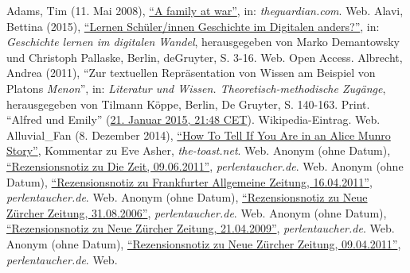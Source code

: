 \documentclass[fontsize=12pt]{scrartcl}
\begin{document}
{{{{\begin{thebibliography}
{\addtolength{\leftmargin}{0,8cm}}
{\setlength{\itemindent}{0,8cm}}
	Adams, Tim (11. Mai 2008), \href{http://www.theguardian.com/books/2008/may/11/fiction.biography}{"`A family at war"'}, in: \textit{theguardian.com}. Web.
	Alavi, Bettina (2015), \href{http://www.degruyter.com/view/books/9783486858662/9783486858662-002/9783486858662-002.xml}{"`Lernen Sch\"uler/innen Geschichte im Digitalen anders?"'}, in: \textit{Geschichte lernen im di\-gitalen Wandel}, he\-rausgegeben von Marko Demantowsky und Christoph Pallaske, Berlin, deGruyter, S. 3-16. Web. Open Access.
	Albrecht, Andrea (2011), "`Zur textuellen Repr\"asentation von Wissen am Beispiel von Platons \textit{Menon}"', in: \textit{Li\-te\-ra\-tur und Wissen. Theo\-retisch-methodische Zug\"ange}, he\-rausgegeben von Tilmann K\"oppe, Berlin, De Gruyter, S. 140-163. Print.
	"`Alfred und Emily"' (\href{https://de.wikipedia.org/w/index.php?title=Alfred_und_Emily&oldid=138028858}{21. Januar 2015, 21:48 CET}). Wi\-ki\-pe\-dia-Ein\-trag. Web.
	Alluvial\_Fan (8. Dezember 2014), \href{http://the-toast.net/2014/12/08/tell-alice-munro-story/\#IDComment926099751}{"`How To Tell If You Are in an Alice Munro Story"'}, Kommentar zu Eve Asher, \textit{the-toast.net}. Web.
	Anonym\textsuperscript{\tiny *} (ohne Datum), \href{http://www.perlentaucher.de/buch/hans-ulrich-gumbrecht/stimmungen-lesen.html}{"`Rezensionsnotiz zu Die Zeit, 09.06.2011"'}, \textit{perlentaucher.de}. Web.
	Anonym\textsuperscript{\tiny *} (ohne Datum), \href{http://www.perlentaucher.de/buch/hans-ulrich-gumbrecht/stimmungen-lesen.html}{"`Rezensionsnotiz zu Frankfurter Allgemeine Zeitung, 16.04.2011"'}, \textit{perlentaucher.de}. Web.
	Anonym\textsuperscript{\tiny *} (ohne Datum), \href{http://www.perlentaucher.de/buch/zoya-pirzad/die-lichter-loesche-ich.html}{"`Rezensionsnotiz zu Neue Z\"urcher Zeitung, 31.08.2006"'}, \textit{perlentaucher.de}. Web.
	Anonym\textsuperscript{\tiny *} (ohne Datum), \href{http://www.perlentaucher.de/buch/doris-lessing/alfred-und-emily.html}{"`Rezensionsnotiz zu Neue Z\"urcher Zeitung, 21.04.2009"'}, \textit{perlentaucher.de}. Web.
	Anonym\textsuperscript{\tiny *} (ohne Datum), \href{http://www.perlentaucher.de/buch/hans-ulrich-gumbrecht/stimmungen-lesen.html}{"`Rezensionsnotiz zu Neue Z\"urcher Zeitung, 09.04.2011"'}, \textit{perlentaucher.de}. Web.

\end{thebibliography}}}}}
\end{document}
